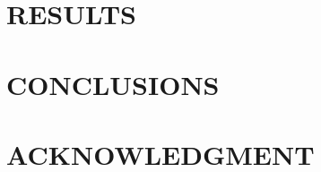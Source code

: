 \documentclass[letterpaper, 10 pt, conference]{ieeeconf}  %
\begin{document}
\section{RESULTS}

\section{CONCLUSIONS}











\section*{ACKNOWLEDGMENT}






\end{document}
